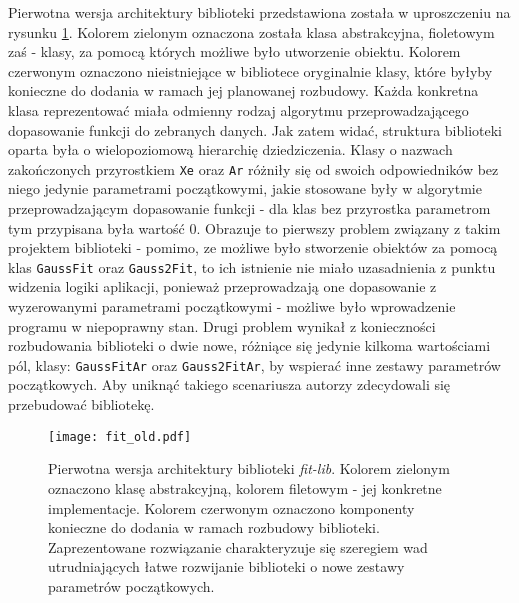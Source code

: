 Pierwotna wersja architektury biblioteki przedstawiona została w uproszczeniu na rysunku \ref{fig:fit_old}. Kolorem zielonym oznaczona została klasa abstrakcyjna, fioletowym zaś - klasy, za pomocą których możliwe było utworzenie obiektu. Kolorem czerwonym oznaczono nieistniejące w bibliotece oryginalnie klasy, które byłyby konieczne do dodania w ramach jej planowanej rozbudowy. Każda konkretna klasa reprezentować miała odmienny rodzaj algorytmu przeprowadzającego dopasowanie funkcji do zebranych danych. Jak zatem widać, struktura biblioteki oparta była o wielopoziomową hierarchię dziedziczenia. Klasy o nazwach zakończonych przyrostkiem \lstinline{Xe} oraz \lstinline{Ar} różniły się od swoich odpowiedników bez niego jedynie parametrami początkowymi, jakie stosowane były w algorytmie przeprowadzającym dopasowanie funkcji - dla klas bez przyrostka parametrom tym przypisana była wartość 0. Obrazuje to pierwszy problem związany z takim projektem biblioteki - pomimo, ze możliwe było stworzenie obiektów za pomocą klas \lstinline{GaussFit} oraz \lstinline{Gauss2Fit}, to ich istnienie nie miało uzasadnienia z punktu widzenia logiki aplikacji, ponieważ przeprowadzają one dopasowanie z wyzerowanymi parametrami początkowymi - możliwe było wprowadzenie programu w niepoprawny stan. Drugi problem wynikał z konieczności rozbudowania biblioteki o dwie nowe, różniące się jedynie kilkoma wartościami pól, klasy: \lstinline{GaussFitAr} oraz \lstinline{Gauss2FitAr}, by wspierać inne zestawy parametrów początkowych. Aby uniknąć takiego scenariusza autorzy zdecydowali się przebudować bibliotekę.


\begin{figure}[H]
\centering
\texttt{[image: fit\_old.pdf]}
\caption{Pierwotna wersja architektury biblioteki \emph{fit-lib}. Kolorem zielonym oznaczono klasę abstrakcyjną, kolorem filetowym - jej konkretne implementacje. Kolorem czerwonym oznaczono komponenty konieczne do dodania w ramach rozbudowy biblioteki. Zaprezentowane rozwiązanie charakteryzuje się szeregiem wad utrudniających łatwe rozwijanie biblioteki o nowe zestawy parametrów początkowych.}
\label{fig:fit_old}
\end{figure}

